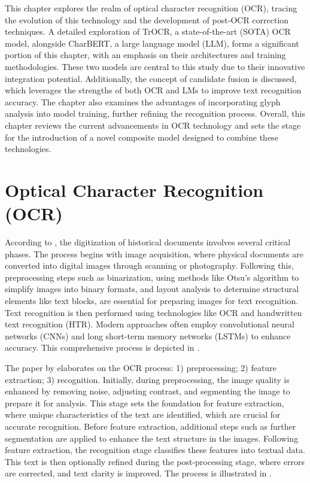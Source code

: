 \label{chap:2_related_work}
This chapter explores the realm of optical character recognition (OCR), tracing the evolution of this technology and the development of post-OCR correction techniques. A detailed exploration of TrOCR, a state-of-the-art (SOTA) OCR model, alongside CharBERT, a large language model (LLM), forms a significant portion of this chapter, with an emphasis on their architectures and training methodologies. These two models are central to this study due to their innovative integration potential. Additionally, the concept of candidate fusion is discussed, which leverages the strengths of both OCR and LMs to improve text recognition accuracy. The chapter also examines the advantages of incorporating glyph analysis into model training, further refining the recognition process. Overall, this chapter reviews the current advancements in OCR technology and sets the stage for the introduction of a novel composite model designed to combine these technologies.

\section{Optical Character Recognition (OCR)}
\label{sec:2_ocr}
According to \cite{philips2020historical}, the digitization of historical documents involves several critical phases. The process begins with image acquisition, where physical documents are converted into digital images through scanning or photography. Following this, preprocessing steps such as binarization, using methods like Otsu's algorithm \citep{liu2009otsu} to simplify images into binary formats, and layout analysis to determine structural elements like text blocks, are essential for preparing images for text recognition. Text recognition is then performed using technologies like OCR and handwritten text recognition (HTR). Modern approaches often employ convolutional neural networks (CNNs) \citep{zhang2017cnn} and long short-term memory networks (LSTMs) \citep{breuel2013high} to enhance accuracy. This comprehensive process is depicted in .


The paper by \cite{karthick2019steps} elaborates on the OCR process: 1) preprocessing; 2) feature extraction; 3) recognition. Initially, during preprocessing, the image quality is enhanced by removing noise, adjusting contrast, and segmenting the image to prepare it for analysis. This stage sets the foundation for feature extraction, where unique characteristics of the text are identified, which are crucial for accurate recognition. Before feature extraction, additional steps such as further segmentation are applied to enhance the text structure in the images. Following feature extraction, the recognition stage classifies these features into textual data. This text is then optionally refined during the post-processing stage, where errors are corrected, and text clarity is improved. The process is illustrated in .

